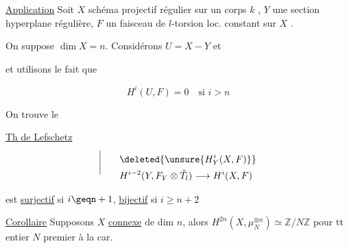 
\uline{Application} \quad Soit $X$ schéma projectif régulier sur
un corps $k$ , $Y$ une section hyperplane
régulière, $F$ un faisceau de $l$-torsion loc.
constant sur $X$ .

On suppose \uline{$\dim X=n$}. Considérons $U=X-Y$ et


et utilisons le fait que

\[ H^i(U,F)=0 \quad\text{si } i>n \]

On trouve le

\uline{Th de Lefschetz}

\[
\begin{aligned}
\smash{\rule[-3ex]{.4pt}{5.8ex}}\qquad&\deleted{\unsure{H^i_Y(X,F)}}\\
&H^{i-2}(Y,F_Y\otimes\check T_l)\longrightarrow H^i(X,F)
\end{aligned}
\]

est \uline{surjectif} si $i\geqn+1$, \uline{bijectif} si $i\geq n+2$

\uline{Corollaire} \quad Supposons $X$ \uline{connexe}  de dim $n$,
\llap{\smash{\rule[-1.8ex]{.4pt}{4.2ex}}\hspace{.7em}}alors $H^{2n}(X,\mu_N^{\otimes n})\simeq\mathbb Z/N\mathbb Z$ pour tt
entier $N$ premier à la car.

